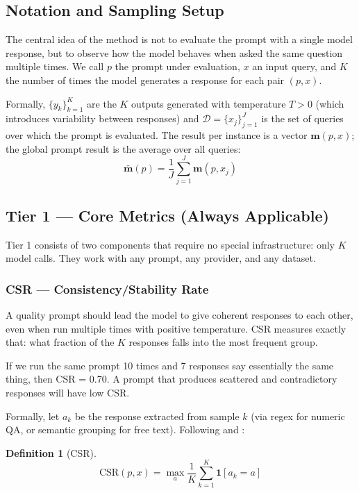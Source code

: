 \documentclass[11pt,a4paper]{article}
\newtheorem{definition}{Definition}
\begin{document}
\subsection{Notation and Sampling Setup}

The central idea of the method is not to evaluate the prompt with a single model response, but to observe how the model behaves when asked the same question multiple times. We call $p$ the prompt under evaluation, $x$ an input query, and $K$ the number of times the model generates a response for each pair $(p, x)$.

Formally, $\{y_k\}_{k=1}^{K}$ are the $K$ outputs generated with temperature $T > 0$ (which introduces variability between responses) and $\mathcal{D} = \{x_j\}_{j=1}^{J}$ is the set of queries over which the prompt is evaluated. The result per instance is a vector $\mathbf{m}(p, x)$; the global prompt result is the average over all queries:
\[
\bar{\mathbf{m}}(p) = \frac{1}{J} \sum_{j=1}^{J} \mathbf{m}(p, x_j)
\]

\subsection{Tier 1 — Core Metrics (Always Applicable)}

Tier 1 consists of two components that require no special infrastructure: only $K$ model calls. They work with any prompt, any provider, and any dataset.

\subsubsection{CSR — Consistency/Stability Rate}

A quality prompt should lead the model to give coherent responses to each other, even when run multiple times with positive temperature. CSR measures exactly that: what fraction of the $K$ responses falls into the most frequent group.

If we run the same prompt 10 times and 7 responses say essentially the same thing, then CSR = 0.70. A prompt that produces scattered and contradictory responses will have low CSR.

Formally, let $a_k$ be the response extracted from sample $k$ (via regex for numeric QA, or semantic grouping for free text). Following \citet{selfconsistency2023} and \citet{glape2024}:

\begin{definition}[CSR]
\[
\mathrm{CSR}(p, x) = \max_{a} \frac{1}{K} \sum_{k=1}^{K} \mathbf{1}[a_k = a]
\]
\end{definition}
\end{document}

